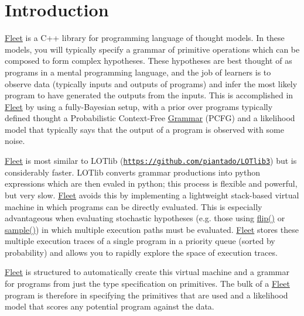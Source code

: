 \hypertarget{index_intro_sec}{}\section{Introduction}\label{index_intro_sec}
\hyperlink{class_fleet}{Fleet} is a C++ library for programming language of thought models. In these models, you will typically specify a grammar of primitive operations which can be composed to form complex hypotheses. These hypotheses are best thought of as programs in a mental programming language, and the job of learners is to observe data (typically inputs and outputs of programs) and infer the most likely program to have generated the outputs from the inputs. This is accomplished in \hyperlink{class_fleet}{Fleet} by using a fully-\/\+Bayesian setup, with a prior over programs typically defined thought a Probabilistic Context-\/\+Free \hyperlink{class_grammar}{Grammar} (P\+C\+FG) and a likelihood model that typically says that the output of a program is observed with some noise.

\hyperlink{class_fleet}{Fleet} is most similar to L\+O\+Tlib (\href{https://github.com/piantado/LOTlib3}{\tt https\+://github.\+com/piantado/\+L\+O\+Tlib3}) but is considerably faster. L\+O\+Tlib converts grammar productions into python expressions which are then evaled in python; this process is flexible and powerful, but very slow. \hyperlink{class_fleet}{Fleet} avoids this by implementing a lightweight stack-\/based virtual machine in which programs can be directly evaluated. This is especially advantageous when evaluating stochastic hypotheses (e.\+g. those using \hyperlink{_random_8h_ae295082303ce2024a3de1c53dc99568e}{flip()} or \hyperlink{_random_8h_ac2ea1cac6b4c8cad207512d19abe42d7}{sample()}) in which multiple execution paths must be evaluated. \hyperlink{class_fleet}{Fleet} stores these multiple execution traces of a single program in a priority queue (sorted by probability) and allows you to rapidly explore the space of execution traces.

\hyperlink{class_fleet}{Fleet} is structured to automatically create this virtual machine and a grammar for programs from just the type specification on primitives. The bulk of a \hyperlink{class_fleet}{Fleet} program is therefore in specifying the primitives that are used and a likelihood model that scores any potential program against the data.

